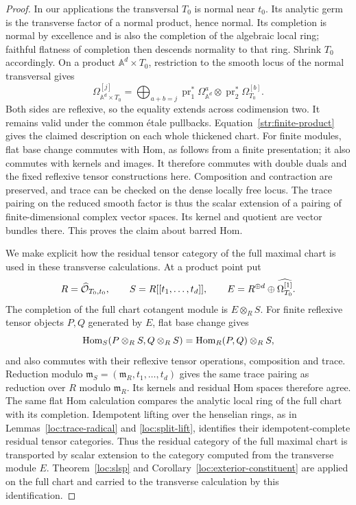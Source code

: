 \begin{proof}
In our applications the transversal $T_0$ is normal near $t_0$.
Its analytic germ is the transverse factor of a normal product, hence
normal.  Its completion is normal by excellence and is also the
completion of the algebraic local ring; faithful flatness of completion
then descends normality to that ring.  Shrink $T_0$ accordingly.
On a product $\mathbb A^d\times T_0$, restriction to the smooth locus
of the normal transversal gives
\begin{equation}\label{str:cotangent-product}
 \Omega^{[j]}_{\mathbb A^d\times T_0}
 =\bigoplus_{a+b=j}
      \operatorname{pr}_1^*\Omega^a_{\mathbb A^d}
          \otimes\operatorname{pr}_2^*\Omega_{T_0}^{[b]}.
\end{equation}
Both sides are reflexive, so the equality extends across codimension
two.  It remains valid under the common \'etale pullbacks.
Equation~\eqref{str:finite-product} gives the claimed description on
each whole thickened chart.  For finite modules, flat base change
commutes with Hom, as follows from a finite presentation; it also
commutes with kernels and images.  It therefore commutes with double
duals and the fixed reflexive tensor constructions here.  Composition
and contraction are preserved, and trace can be checked on the dense
locally free locus.  The trace pairing on the reduced smooth factor is
thus the scalar extension of a pairing of finite-dimensional complex
vector spaces.  Its kernel and quotient are vector bundles there.
This proves the claim about barred Hom.

We make explicit how the residual tensor category of the full maximal
chart is used in these transverse calculations.  At a product point put
\[
 R=\widehat{\mathcal O}_{T_0,t_0},\qquad
 S=R[[t_1,\ldots,t_d]],\qquad
 E=R^{\oplus d}\oplus\widehat{\Omega_{T_0}^{[1]}}.
\]
The completion of the full chart cotangent module is $E\otimes_RS$.
For finite reflexive tensor objects $P,Q$ generated by $E$, flat
base change gives
\[
 \operatorname{Hom}_S(P\otimes_RS,Q\otimes_RS)
       =\operatorname{Hom}_R(P,Q)\otimes_RS,
\]
and also commutes with their reflexive tensor operations, composition
and trace.  Reduction modulo
$\mathfrak m_S=(\mathfrak m_R,t_1,\ldots,t_d)$ gives the same trace
pairing as reduction over $R$ modulo $\mathfrak m_R$.  Its kernels and
residual Hom spaces therefore agree.  The same flat Hom calculation
compares the analytic local ring of the full chart with its completion.
Idempotent lifting over the henselian rings, as in
Lemmas~\ref{loc:trace-radical} and \ref{loc:split-lift}, identifies
their idempotent-complete residual tensor categories.  Thus the
residual category of the full maximal chart is transported by scalar
extension to the category computed from the transverse module $E$.
Theorem~\ref{loc:slsp} and Corollary~\ref{loc:exterior-constituent}
are applied on the full chart and carried to the transverse
calculation by this identification.


\end{proof}
